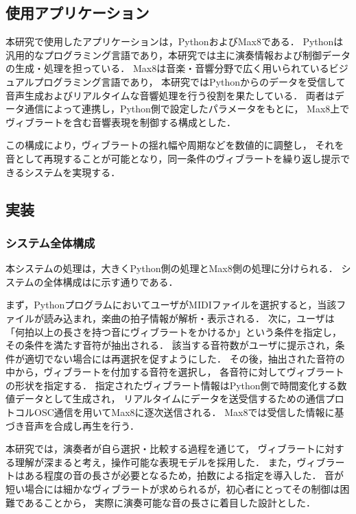 \subsection{使用アプリケーション}

本研究で使用したアプリケーションは，PythonおよびMax8である．
Pythonは汎用的なプログラミング言語であり，本研究では主に演奏情報および制御データの生成・処理を担っている．
Max8は音楽・音響分野で広く用いられているビジュアルプログラミング言語であり，
本研究ではPythonからのデータを受信して音声生成およびリアルタイムな音響処理を行う役割を果たしている．
両者はデータ通信によって連携し，Python側で設定したパラメータをもとに，
Max8上でヴィブラートを含む音響表現を制御する構成とした．

この構成により，ヴィブラートの揺れ幅や周期などを数値的に調整し，
それを音として再現することが可能となり，同一条件のヴィブラートを繰り返し提示できるシステムを実現する．


\subsection{実装}

\subsubsection{システム全体構成}

本システムの処理は，大きくPython側の処理とMax8側の処理に分けられる．
システムの全体構成はに示す通りである．

まず，PythonプログラムにおいてユーザがMIDIファイルを選択すると，当該ファイルが読み込まれ，楽曲の拍子情報が解析・表示される．
次に，ユーザは「何拍以上の長さを持つ音にヴィブラートをかけるか」という条件を指定し，
その条件を満たす音符が抽出される．
該当する音符数がユーザに提示され，条件が適切でない場合には再選択を促すようにした．
その後，抽出された音符の中から，ヴィブラートを付加する音符を選択し，
各音符に対してヴィブラートの形状を指定する．
指定されたヴィブラート情報はPython側で時間変化する数値データとして生成され，
リアルタイムにデータを送受信するための通信プロトコルOSC通信を用いてMax8に逐次送信される．
Max8では受信した情報に基づき音声を合成し再生を行う．

本研究では，演奏者が自ら選択・比較する過程を通じて，
ヴィブラートに対する理解が深まると考え，操作可能な表現モデルを採用した．
また，ヴィブラートはある程度の音の長さが必要となるため，拍数による指定を導入した．
音が短い場合には細かなヴィブラートが求められるが，初心者にとってその制御は困難であることから，
実際に演奏可能な音の長さに着目した設計とした．

